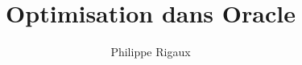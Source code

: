 \documentclass[pdf,blends,slideColor,colorBG]{prosper}
\begin{document}
\title{Optimisation dans Oracle}
\author{Philippe Rigaux}
\end{document}
